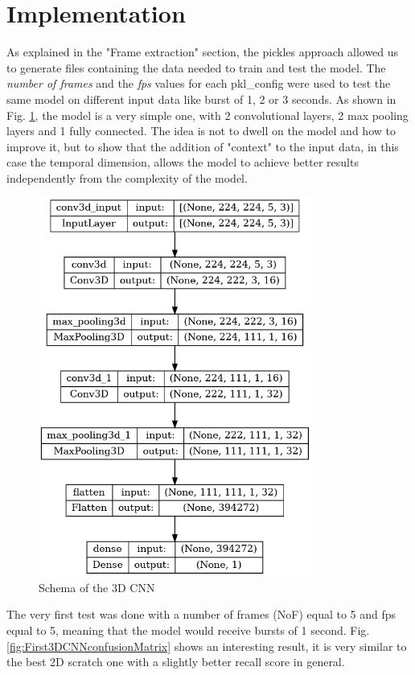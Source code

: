 \section{Implementation}
As explained in the "Frame extraction" section, the pickles approach allowed us to generate files containing the data needed to train and test the model. The \textit{number of frames} and the \textit{fps} values for each pkl\_config were used to test the same model on different input data like burst of 1, 2 or 3 seconds. As shown in Fig. \ref{fig:3DCNNschema}, the model is a very simple one, with 2 convolutional layers, 2 max pooling layers and 1 fully connected. The idea is not to dwell on the model and how to improve it, but to show that the addition of "context" to the input data, in this case the temporal dimension, allows the model to achieve better results independently from the complexity of the model.
\begin{figure}[]
    \centering
    \includegraphics[width=0.8\textwidth, height=0.6\textwidth, keepaspectratio]{images/3D9CNNschema.png}
    \caption{Schema of the 3D CNN}
    \label{fig:3DCNNschema}
\end{figure}

The very first test was done with a number of frames (NoF) equal to 5 and fps equal to 5, meaning that the model would receive bursts of 1 second. Fig. \ref{fig:First3DCNNconfusionMatrix} shows an interesting result, it is very similar to the best 2D scratch one with a slightly better recall score in general.

